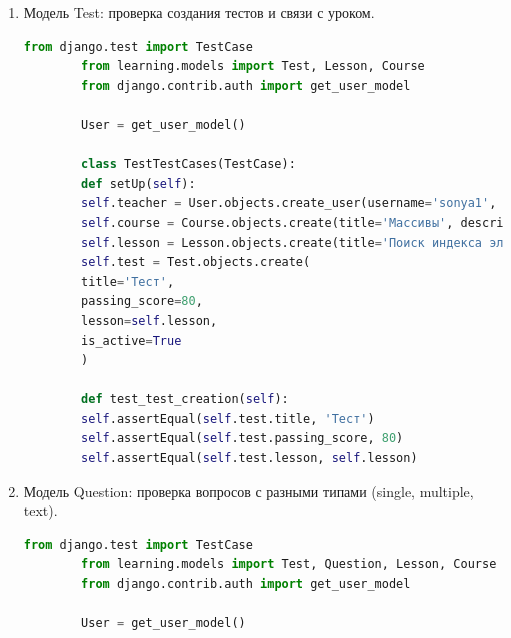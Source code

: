 \begin{enumerate}
\begin{lstlisting}[language=Python, caption=Модульный тест для Lesson, label=lst:lesson_test]
		User = get_user_model()
		
		class LessonTestCases(TestCase):
		def setUp(self):
		self.teacher = User.objects.create_user(username='sonya1', password='vanya232323', is_teacher=True)
		self.course = Course.objects.create(title='Массивы', description='Описание курса', creator=self.teacher)
		self.lesson = Lesson.objects.create(
		title='Что такое массивы',
		content='Содержимое урока',
		order=1,
		course=self.course,
		is_published=True
		)
		
		def test_lesson_creation(self):
		self.assertEqual(self.lesson.title, 'Что такое массивы')
		self.assertEqual(self.lesson.order, 1)
		self.assertEqual(self.lesson.course, self.course)
	\end{lstlisting}
	
	\item Модель Test: проверка создания тестов и связи с уроком.
	\begin{lstlisting}[language=Python, caption=Модульный тест для Test, label=lst:test_test]
		from django.test import TestCase
		from learning.models import Test, Lesson, Course
		from django.contrib.auth import get_user_model
		
		User = get_user_model()
		
		class TestTestCases(TestCase):
		def setUp(self):
		self.teacher = User.objects.create_user(username='sonya1', password='vanya232323', is_teacher=True)
		self.course = Course.objects.create(title='Массивы', description='Описание курса', creator=self.teacher)
		self.lesson = Lesson.objects.create(title='Поиск индекса элемента в массиве', content='Содержимое урока', order=1, course=self.course)
		self.test = Test.objects.create(
		title='Тест',
		passing_score=80,
		lesson=self.lesson,
		is_active=True
		)
		
		def test_test_creation(self):
		self.assertEqual(self.test.title, 'Тест')
		self.assertEqual(self.test.passing_score, 80)
		self.assertEqual(self.test.lesson, self.lesson)
	\end{lstlisting}
	
	\item Модель Question: проверка вопросов с разными типами (single, multiple, text).
	\begin{lstlisting}[language=Python, caption=Модульный тест для Question, label=lst:question_test]
		from django.test import TestCase
		from learning.models import Test, Question, Lesson, Course
		from django.contrib.auth import get_user_model
		
		User = get_user_model()
		

\end{lstlisting}
\end{enumerate}
